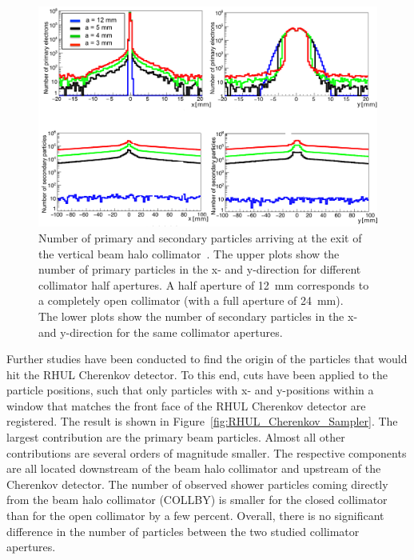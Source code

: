 \begin{figure}[!h]
\centering
\includegraphics[width=\textwidth]{Figures/ATF/Collimator_secondaries_Nuria_Thesis.png}
\caption[Number of particles at the beam halo collimator]{Number of primary and secondary particles arriving at the exit of the vertical beam halo collimator~\cite[cf. p. 152]{Nuria_Thesis}.
The upper plots show the number of primary particles in the x- and y-direction for different collimator half apertures.
A half aperture of \SI[detect-all]{12}{\milli\meter} corresponds to a completely open collimator (with a full aperture of \SI[detect-all]{24}{\milli\meter}).
\\The lower plots show the number of secondary particles in the x- and y-direction for the same collimator apertures.}
\label{fig:Particles_Collimator}
\end{figure}

Further studies have been conducted to find the origin of the particles that would hit the RHUL Cherenkov detector.
To this end, cuts have been applied to the particle positions, such that only particles with x- and y-positions within a window that matches the front face of the RHUL Cherenkov detector are registered.
The result is shown in Figure~\ref{fig:RHUL_Cherenkov_Sampler}.
The largest contribution are the primary beam particles.
Almost all other contributions are several orders of magnitude smaller.
The respective components are all located downstream of the beam halo collimator and upstream of the Cherenkov detector.
The number of observed shower particles coming directly from the beam halo collimator (COLLBY) is smaller for the closed collimator than for the open collimator by a few percent.
Overall, there is no significant difference in the number of particles between the two studied collimator apertures.

